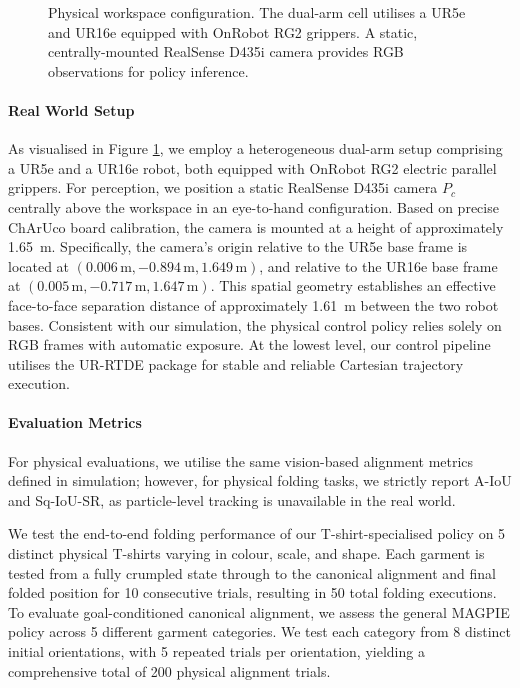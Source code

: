 \documentclass[journal]{IEEEtran}
\begin{document}
\begin{figure}[!h]
    \centering
    \caption{Physical workspace configuration. The dual-arm cell utilises a UR5e and UR16e equipped with OnRobot RG2 grippers. A static, centrally-mounted RealSense D435i camera provides RGB observations for policy inference.}
    \label{fig:real_world_setup}
\end{figure}

\paragraph{Real World Setup} 
As visualised in Figure \ref{fig:real_world_setup}, we employ a heterogeneous dual-arm setup comprising a UR5e and a UR16e robot, both equipped with OnRobot RG2 electric parallel grippers. For perception, we position a static RealSense D435i camera $P_c$ centrally above the workspace in an eye-to-hand configuration. Based on precise ChArUco board calibration, the camera is mounted at a height of approximately 1.65~m. Specifically, the camera's origin relative to the UR5e base frame is located at $(0.006\,\mathrm{m}, -0.894\,\mathrm{m}, 1.649\,\mathrm{m})$, and relative to the UR16e base frame at $(0.005\,\mathrm{m}, -0.717\,\mathrm{m}, 1.647\,\mathrm{m})$. This spatial geometry establishes an effective face-to-face separation distance of approximately 1.61~m between the two robot bases. Consistent with our simulation, the physical control policy relies solely on RGB frames with automatic exposure. At the lowest level, our control pipeline utilises the UR-RTDE package \cite{urrtde2025} for stable and reliable Cartesian trajectory execution.

\paragraph{Evaluation Metrics} 
For physical evaluations, we utilise the same vision-based alignment metrics defined in simulation; however, for physical folding tasks, we strictly report A-IoU and Sq-IoU-SR, as particle-level tracking is unavailable in the real world. 

We test the end-to-end folding performance of our T-shirt-specialised policy on 5 distinct physical T-shirts varying in colour, scale, and shape. Each garment is tested from a fully crumpled state through to the canonical alignment and final folded position for 10 consecutive trials, resulting in 50 total folding executions. To evaluate goal-conditioned canonical alignment, we assess the general MAGPIE policy across 5 different garment categories. We test each category from 8 distinct initial orientations, with 5 repeated trials per orientation, yielding a comprehensive total of 200 physical alignment trials.
\end{document}
